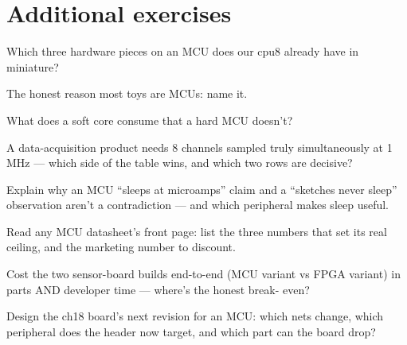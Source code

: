 \section*{Additional exercises}

\begin{exercise}[easy]
Which three hardware pieces on an MCU does our cpu8 already have
in miniature?
\end{exercise}
\begin{exercise}[easy]
The honest reason most toys are MCUs: name it.
\end{exercise}
\begin{exercise}[easy]
What does a soft core consume that a hard MCU doesn't?
\end{exercise}
\begin{exercise}[medium]
A data-acquisition product needs 8 channels sampled truly
simultaneously at 1\,MHz --- which side of the table wins, and
which two rows are decisive?
\end{exercise}
\begin{exercise}[medium]
Explain why an MCU ``sleeps at microamps'' claim and a ``sketches
never sleep'' observation aren't a contradiction --- and which
peripheral makes sleep useful.
\end{exercise}
\begin{exercise}[medium]
Read any MCU datasheet's front page: list the three numbers that
set its real ceiling, and the marketing number to discount.
\end{exercise}
\begin{exercise}[hard]
Cost the two sensor-board builds end-to-end (MCU variant vs FPGA
variant) in parts AND developer time --- where's the honest break-
even?
\end{exercise}
\begin{exercise}[hard]
Design the ch18 board's next revision for an MCU: which nets
change, which peripheral does the header now target, and which
part can the board drop?
\end{exercise}

